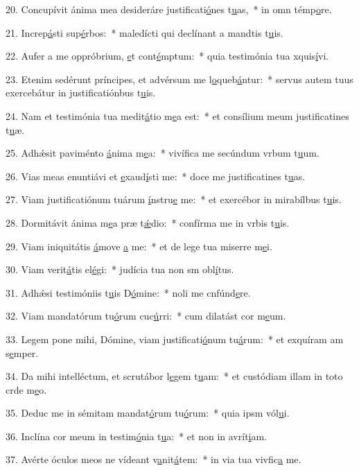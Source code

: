20. Concupívit ánima mea desideráre justificati\uline{ó}nes t\uline{u}as,~* in omn témp\uline{o}re.\par 
21. Increp\uline{á}sti sup\uline{é}rbos:~* maledícti qui declínant a mandtis t\uline{u}is.\par 
22. Aufer a me oppróbrium, \uline{e}t cont\uline{é}mptum:~* quia testimónia tua xquis\uline{í}vi.\par 
23. Etenim sedérunt príncipes, et advérsum me l\uline{o}queb\uline{á}ntur:~* servus autem tuus exercebátur in justificatiónbus t\uline{u}is.\par 
24. Nam et testimónia tua medit\uline{á}tio m\uline{e}a est:~* et consílium meum justificatines t\uline{u}æ.\par 
25. Adhǽsit paviménto \uline{á}nima m\uline{e}a:~* vivífica me secúndum vrbum t\uline{u}um.\par 
26. Vias meas enuntiávi et \uline{e}xaud\uline{í}sti me:~* doce me justificatines t\uline{u}as.\par 
27. Viam justificatiónum tuárum \uline{í}nstru\uline{e} me:~* et exercébor in mirabílbus t\uline{u}is.\par 
28. Dormitávit ánima m\uline{e}a præ t\uline{ǽ}dio:~* confírma me in vrbis t\uline{u}is.\par 
29. Viam iniquitátis \uline{á}move \uline{a} me:~* et de lege tua miserre m\uline{e}i.\par 
30. Viam verit\uline{á}tis el\uline{é}gi:~* judícia tua non sm obl\uline{í}tus.\par 
31. Adhǽsi testimóniis t\uline{u}is D\uline{ó}mine:~* noli me cnfúnd\uline{e}re.\par 
32. Viam mandatórum tu\uline{ó}rum cuc\uline{ú}rri:~* cum dilatást cor m\uline{e}um.\par 
33. Legem pone mihi, Dómine, viam justificati\uline{ó}num tu\uline{á}rum:~* et exquíram am s\uline{e}mper.\par 
34. Da mihi intelléctum, et scrutábor l\uline{e}gem t\uline{u}am:~* et custódiam illam in toto crde m\uline{e}o.\par 
35. Deduc me in sémitam mandat\uline{ó}rum tu\uline{ó}rum:~* quia ipsm vól\uline{u}i.\par 
36. Inclína cor meum in testim\uline{ó}nia t\uline{u}a:~* et non in avrít\uline{i}am.\par 
37. Avérte óculos meos ne vídeant v\uline{a}nit\uline{á}tem:~* in via tua vivfic\uline{a} me.\par 
